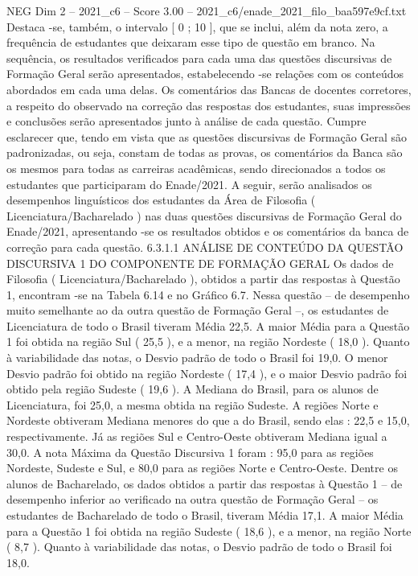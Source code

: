 \begin{textsample}{NEG Dim 2 – 2021\_c6 – Score 3.00 – 2021\_c6/enade\_2021\_filo\_baa597e9cf.txt}
Destaca -se, também, o intervalo [ 0 ; 10 ], que se inclui, além da nota zero, a frequência de estudantes que deixaram esse tipo de questão em branco.
Na sequência, os resultados verificados para cada uma das questões discursivas de Formação Geral serão apresentados, estabelecendo -se relações com os conteúdos abordados em cada uma delas.
Os comentários das Bancas de docentes corretores, a respeito do observado na correção das respostas dos estudantes, suas impressões e conclusões serão apresentados junto à análise de cada questão.
Cumpre esclarecer que, tendo em vista que as questões discursivas de Formação Geral são padronizadas, ou seja, constam de todas as provas, os comentários da Banca são os mesmos para todas as carreiras acadêmicas, sendo direcionados a todos os estudantes que participaram do Enade/2021.
A seguir, serão analisados os desempenhos linguísticos dos estudantes da Área de Filosofia ( Licenciatura/Bacharelado ) nas duas questões discursivas de Formação Geral do Enade/2021, apresentando -se os resultados obtidos e os comentários da banca de correção para cada questão. 6.3.1.1 ANÁLISE DE CONTEÚDO DA QUESTÃO DISCURSIVA 1 DO COMPONENTE DE FORMAÇÃO GERAL Os dados de Filosofia ( Licenciatura/Bacharelado ), obtidos a partir das respostas à Questão 1, encontram -se na Tabela 6.14 e no Gráfico 6.7.
Nessa questão – de desempenho muito semelhante ao da outra questão de Formação Geral –, os estudantes de Licenciatura de todo o Brasil tiveram Média 22,5.
A maior Média para a Questão 1 foi obtida na região Sul ( 25,5 ), e a menor, na região Nordeste ( 18,0 ).
Quanto à variabilidade das notas, o Desvio padrão de todo o Brasil foi 19,0.
O menor Desvio padrão foi obtido na região Nordeste ( 17,4 ), e o maior Desvio padrão foi obtido pela região Sudeste ( 19,6 ).
A Mediana do Brasil, para os alunos de Licenciatura, foi 25,0, a mesma obtida na região Sudeste.
A regiões Norte e Nordeste obtiveram Mediana menores do que a do Brasil, sendo elas : 22,5 e 15,0, respectivamente.
Já as regiões Sul e Centro-Oeste obtiveram Mediana igual a 30,0.
A nota Máxima da Questão Discursiva 1 foram : 95,0 para as regiões Nordeste, Sudeste e Sul, e 80,0 para as regiões Norte e Centro-Oeste.
Dentre os alunos de Bacharelado, os dados obtidos a partir das respostas à Questão 1 – de desempenho inferior ao verificado na outra questão de Formação Geral – os estudantes de Bacharelado de todo o Brasil, tiveram Média 17,1.
A maior Média para a Questão 1 foi obtida na região Sudeste ( 18,6 ), e a menor, na região Norte ( 8,7 ).
Quanto à variabilidade das notas, o Desvio padrão de todo o Brasil foi 18,0.

\end{textsample}
